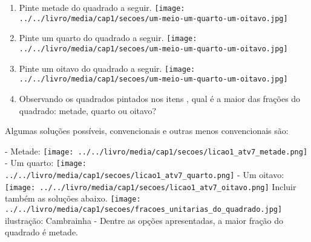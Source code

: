 \documentclass[a4paper,12pt,twoside]{book}
\begin{document}
\begin{enumerate} [\quad a)] %
  \item     Pinte metade do quadrado a seguir.    \mbox{} \newline              \texttt{[image: ../../livro/media/cap1/secoes/um-meio-um-quarto-um-oitavo.jpg]}
  \item     Pinte um quarto do quadrado a seguir.    \mbox{} \newline              \texttt{[image: ../../livro/media/cap1/secoes/um-meio-um-quarto-um-oitavo.jpg]}
  \item     Pinte um oitavo do quadrado a seguir.    \mbox{} \newline              \texttt{[image: ../../livro/media/cap1/secoes/um-meio-um-quarto-um-oitavo.jpg]}
  \item     Observando os quadrados pintados nos itens , qual é a maior das frações do quadrado: metade, quarto ou oitavo?
\end{enumerate} %


\begin{resposta*}[breakable]{}{}  
  
  Algumas soluções possíveis, convencionais e outras menos convencionais são:  
  
        - Metade:   \mbox{} \newline        \texttt{[image: ../../livro/media/cap1/secoes/licao1\_atv7\_metade.png]}  
        - Um quarto:  \mbox{} \newline        \texttt{[image: ../../livro/media/cap1/secoes/licao1\_atv7\_quarto.png]}  
        - Um oitavo:   \mbox{} \newline        \texttt{[image: ../../livro/media/cap1/secoes/licao1\_atv7\_oitavo.png]}  \mbox{} \newline    Incluir também as soluções abaixo.  \mbox{} \newline        \texttt{[image: ../../livro/media/cap1/secoes/fracoes\_unitarias\_do\_quadrado.jpg]}  \mbox{} \newline    ilustração: Cambrainha  
        - Dentre as opções apresentadas, a maior fração do quadrado é metade.  
  
  
  
\end{resposta*}
\end{document}
